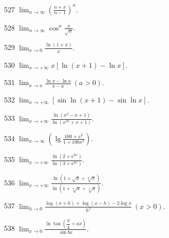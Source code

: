 \begin{prob}[S]{527}
$\displaystyle \lim_{n\to \infty} \left(\frac{n+x}{n-1}\right)^n.$
\end{prob}

\begin{prob}[S]{528}
$\displaystyle \lim_{n\to \infty} \cos^n \frac{x}{\sqrt{n}}.$
\end{prob}

\begin{prob}[S]{529}
$\displaystyle \lim_{x\to 0} \frac{\ln(1+x)}{x}.$
\end{prob}

\begin{prob}[S]{530}
$\displaystyle \lim_{x\to +\infty} x[\ln(x+1) - \ln x].$
\end{prob}

\begin{prob}[S]{531}
$\displaystyle \lim_{x\to a} \frac{\ln x - \ln a}{x-a} \ (a > 0).$
\end{prob}

\begin{prob}[S]{532}
$\displaystyle \lim_{x\to +\infty} [\sin\ln(x+1) - \sin\ln x].$
\end{prob}

\begin{prob}[S]{533}
$\displaystyle \lim_{x\to +\infty} \frac{\ln(x^2-x+1)}{\ln(x^{10}+x+1)}.$
\end{prob}

\begin{prob}[S]{534}
$\displaystyle \lim_{x\to \infty} \left(\lg\frac{100+x^2}{1+100x^2}\right).$
\end{prob}

\begin{prob}[S]{535}
$\displaystyle \lim_{x\to +\infty} \frac{\ln(2+\mathrm{e}^{3x})}{\ln(3+\mathrm{e}^{2x})}.$
\end{prob}

\begin{prob}[S]{536}
$\displaystyle \lim_{x\to +\infty} \frac{\ln(1+\sqrt{x}+\sqrt[3]{x})}{\ln(1+\sqrt[3]{x}+\sqrt[4]{x})}.$
\end{prob}

\begin{prob}[S]{537}
$\displaystyle \lim_{h\to 0} \frac{\log(x+h) + \log(x-h) - 2\log x}{h^2} \ (x > 0).$
\end{prob}

\begin{prob}[S]{538}
$\displaystyle \lim_{x\to 0} \frac{\ln\tan\left(\dfrac{\pi}{4}+ax\right)}{\sin bx}.$
\end{prob}

